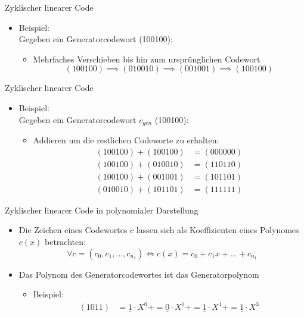 \documentclass[11pt%
,aspectratio=169%
]{beamer}
\begin{document}
\begin{frame}{Zyklischer linearer Code}
		\begin{itemize}	
		\item Beispiel:\\
		Gegeben ein Generatorcodewort (100100):
	    	\begin{itemize}	
		     \item Mehrfaches Verschieben bis hin zum ursprünglichen Codewort 
		     \[(100100) \implies (010010) \implies (001001)\implies (100100)\]
	    	\end{itemize}

	    	\end{itemize}
 
\end{frame}

\begin{frame}{Zyklischer linearer Code}
		\begin{itemize}	
		\item Beispiel:\\
		Gegeben ein Generatorcodewort $c_{gen}$ (100100):
	    	\begin{itemize}	
		     \item Addieren um die restlichen Codeworte zu erhalten:
		     \begin{align*}
		        (100100) + (100100) &= (000000)\\
		     (100100) + (010010) &= (110110)\\
		    (100100) + (001001) &= (101101)\\
		     (010010) + (101101) &= (111111)
		       \end{align*}
	    	\end{itemize}
	    	\end{itemize}
 
\end{frame}

\begin{frame}{Zyklischer linearer Code in polynomialer Darstellung}
	\begin{itemize}	
		\item 	Die Zeichen eines Codewortes $c$ lassen sich als Koeffizienten eines Polynomes $c(x)$ betrachten:
		\[\forall  c=(c_0,c_1,\dots,c_{n_1}) \iff c(x) = c_0 + c_1x + \dots + c_{n_1}\]
	  \item Das Polynom des Generatorcodewortes ist das Generatorpolynom\\
	    	\begin{itemize}	
		     \item Beispiel:
		     \begin{align*}
		         (1011) &= \underline{1}\cdot X^0+= \underline{0}\cdot X^1+= \underline{1}\cdot X^1+= \underline{1}\cdot X^3
		     \end{align*}
		   	\end{itemize}
    \end{itemize}
\end{frame}
\end{document}

